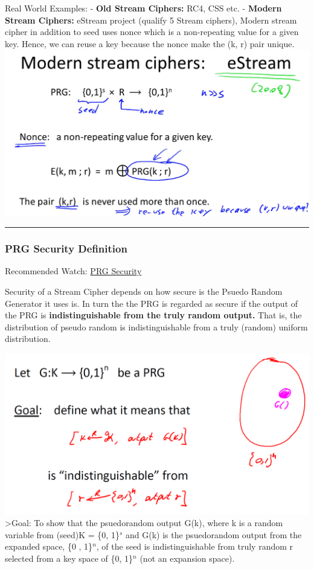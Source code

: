 \documentclass[11pt]{article}
\makeatletter
\def\maxwidth{\ifdim\Gin@nat@width>\linewidth\linewidth
    \else\Gin@nat@width\fi}
\let\Oldincludegraphics\includegraphics
\renewcommand{\includegraphics}[1]{\Oldincludegraphics[width=.8\maxwidth]{#1}}
\makeatother
\begin{document}
Real World Examples: - \textbf{Old Stream Ciphers:} RC4, CSS etc. -
\textbf{Modern Stream Ciphers:} eStream project (qualify 5 Stream
ciphers), Modern stream cipher in addition to seed uses nonce which is a
non-repeating value for a given key. Hence, we can reuse a key because
the nonce make the (k, r) pair unique.
\includegraphics{./Images/ModernStreamCiphers.png}

\begin{center}\rule{0.5\linewidth}{\linethickness}\end{center}

\hypertarget{prg-security-definition}{%
\subsubsection{PRG Security Definition}\label{prg-security-definition}}

Recommended Watch:
\href{https://www.coursera.org/learn/crypto/lecture/De10M/prg-security-definitions}{PRG
Security}

Security of a Stream Cipher depends on how secure is the Psuedo Random
Generator it uses is. In turn the the PRG is regarded as secure if the
output of the PRG is \textbf{indistinguishable from the truly random
output.} That is, the distribution of pseudo random is indistinguishable
from a truly (random) uniform distribution.

\includegraphics{./Images/IndistinguishablePRG.png} \textgreater{}Goal:
To show that the psuedorandom output G(k), where k is a random variable
from (seed)K = \{0, 1\}\(^{s}\) and G(k) is the psuedorandom output from
the expanded space, \{0 , 1\}\(^n\), of the seed is indistinguishable
from truly random r selected from a key space of \{0, 1\}\(^n\) (not an
expansion space).
\end{document}
